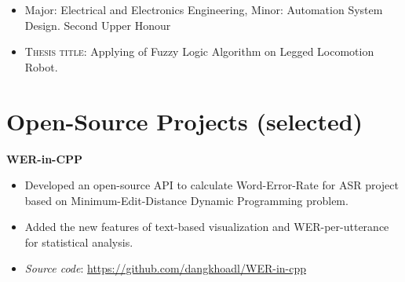 \documentclass[10pt]{article}
\begin{document}
        \vspace{-5mm}
        \begin{itemize}[noitemsep]
            \item Major: Electrical and Electronics Engineering, Minor: Automation System Design. Second Upper Honour
            \item \textsc{Thesis title}: Applying of Fuzzy Logic Algorithm on Legged Locomotion Robot.
        \end{itemize}
    \vspace{2mm}
    \section{Open-Source Projects (selected)}
        \vspace{-2mm}
        \begin{multicols}{1}
            \begin{flushleft}
                \textbf{WER-in-CPP}
            \end{flushleft}
        \end{multicols}
        \vspace{-5mm}
        \begin{itemize}[noitemsep]
            \item Developed an open-source API to calculate Word-Error-Rate for ASR project based on Minimum-Edit-Distance Dynamic Programming problem.
            \item Added the new features of text-based visualization and WER-per-utterance for statistical analysis.
            \item \emph{Source code}: \href{https://github.com/dangkhoadl/WER-in-cpp}{https://github.com/dangkhoadl/WER-in-cpp}
        \end{itemize}
        \vspace{-2mm}
\end{document}
